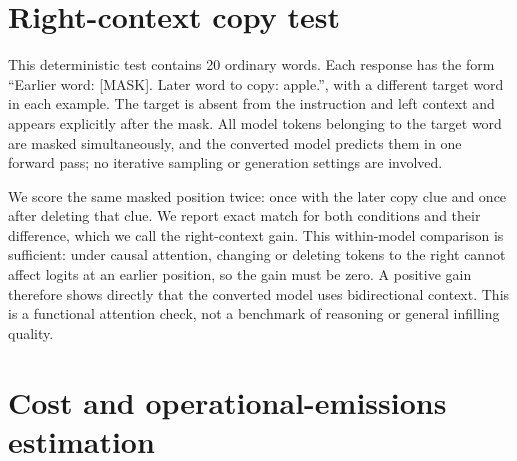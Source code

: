 \documentclass{article}
\begin{document}
\clearpage

\section{Right-context copy test}
\label{app:bidirectional-infilling}

This deterministic test contains 20 ordinary words. Each response has the form ``Earlier word: [MASK]. Later word to copy: apple.'', with a different target word in each example. The target is absent from the instruction and left context and appears explicitly after the mask. All model tokens belonging to the target word are masked simultaneously, and the converted model predicts them in one forward pass; no iterative sampling or generation settings are involved.

We score the same masked position twice: once with the later copy clue and once after deleting that clue. We report exact match for both conditions and their difference, which we call the right-context gain. This within-model comparison is sufficient: under causal attention, changing or deleting tokens to the right cannot affect logits at an earlier position, so the gain must be zero. A positive gain therefore shows directly that the converted model uses bidirectional context. This is a functional attention check, not a benchmark of reasoning or general infilling quality.

\begin{table}[h]
\caption{Right-context copy test on 20 deterministic words. ``With clue'' predicts the earlier mask while the word is visible later; ``without clue'' removes that later word. Gain is the exact-match difference. All values are pending.}
\label{tab:bidirectional-infilling}
\centering
\scriptsize
{}
\end{table}

\section{Cost and operational-emissions estimation}
\label{app:cost}
\end{document}

